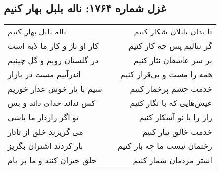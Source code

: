\begin{center}
\section*{غزل شماره ۱۷۶۴: ناله بلبل بهار کنیم}
\label{sec:1764}
\begin{longtable}{l p{0.5cm} r}
ناله بلبل بهار کنیم
&&
تا بدان بلبلان شکار کنیم
\\
کار او ناز و کار ما لابه است
&&
گر ننالیم پس چه کار کنیم
\\
در گلستان رویم و گل چینیم
&&
بر سر عاشقان نثار کنیم
\\
اندرآییم مست در بازار
&&
همه را مست و بی‌قرار کنیم
\\
سیم با یار خوش عذار خوریم
&&
خدمت چشم پرخمار کنیم
\\
کس نداند خدای داند و بس
&&
عیش‌هایی که با نگار کنیم
\\
تو اگر رازدار ما باشی
&&
راز را با تو آشکار کنیم
\\
می گریزند خلق از تاتار
&&
خدمت خالق تبار کنیم
\\
بار کردند اشتران بگریز
&&
رختمان نیست ما چه بار کنیم
\\
خلق خیزان کنند و ما بر بام
&&
اشتر مردمان شمار کنیم
\\
\end{longtable}
\end{center}
